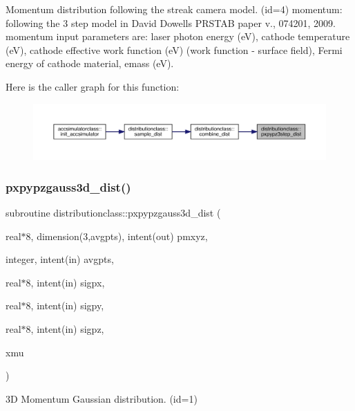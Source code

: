 Momentum distribution following the streak camera model. (id=4) momentum\+: following the 3 step model in David Dowell\textquotesingle{}s P\+R\+S\+T\+AB paper v., 074201, 2009. momentum input parameters are\+: laser photon energy (eV), cathode temperature (eV), cathode effective work function (eV) (work function -\/ surface field), Fermi energy of cathode material, emass (eV). 

Here is the caller graph for this function\+:\nopagebreak
\begin{figure}[H]
\begin{center}
\leavevmode
\includegraphics[width=350pt]{namespacedistributionclass_aaeb585c7c5a8664f047fb95fc7721059_icgraph}
\end{center}
\end{figure}
\mbox{\label{namespacedistributionclass_a93a16b51a7754d6ec2c99d0a8c4f5ced}} 
\subsubsection{\texorpdfstring{pxpypzgauss3d\_dist()}{pxpypzgauss3d\_dist()}}
{\footnotesize\ttfamily subroutine distributionclass\+::pxpypzgauss3d\+\_\+dist (\begin{DoxyParamCaption}\item[{real$\ast$8, dimension(3,avgpts), intent(out)}]{pmxyz,  }\item[{integer, intent(in)}]{avgpts,  }\item[{real$\ast$8, intent(in)}]{sigpx,  }\item[{real$\ast$8, intent(in)}]{sigpy,  }\item[{real$\ast$8, intent(in)}]{sigpz,  }\item[{}]{xmu }\end{DoxyParamCaption})}



3D Momentum Gaussian distribution. (id=1) 

